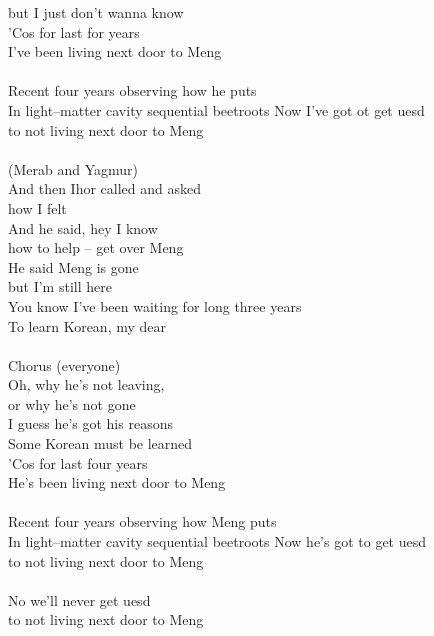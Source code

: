 \begin{preface}
    but I just don't wanna know\\
    'Cos for last for years\\
    I've been living next door to Meng\\
    \\
    Recent four years observing how he puts\\
    In light--matter cavity sequential beetroots Now I've got ot get uesd\\
    to not living next door to Meng\\
    \\
    (Merab and Yagmur)\\
    And then Ihor called and asked\\
    how I felt\\
    And he said, hey I know\\
    how to help -- get over Meng\\
    He said Meng is gone\\
    but I'm still here\\
    You know I've been waiting for long three years\\
    To learn Korean, my dear\\
    \\
    Chorus (everyone)\\
    Oh, why he's not leaving,\\
    or why he's not gone\\
    I guess he's got his reasons\\
    Some Korean must be learned\\
    'Cos for last four years\\
    He's been living next door to Meng\\
    \\
    Recent four years observing how Meng puts\\
    In light--matter cavity sequential beetroots Now he's got to get uesd\\
    to not living next door to Meng\\
    \\
    No we'll never get uesd\\
    to not living next door to Meng
\end{preface}
